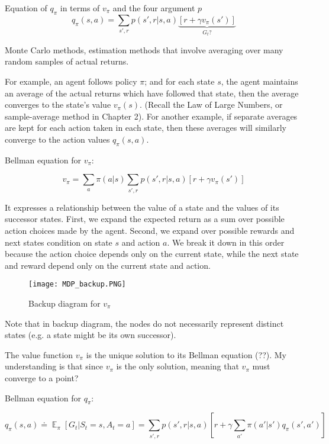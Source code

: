 \documentclass[lang=en,mode=geye,device=normal,color=blue,14pt]{elegantnote}
\DeclareMathOperator*{\E}{\mathbb{E}}
\DeclareMathOperator*{\1}{\mathbbm{1}}
\begin{document}
Equation of $q_\pi$ in terms of $v_\pi$ and the four argument $p$
$$ q_\pi(s,a) = \sum_{s', r} p(s',r|s,a) \underbrace{ [r+\gamma v_\pi(s')] }_{G_t?} $$

\begin{definition}
Monte Carlo methods, estimation methods that involve averaging over many random samples of actual returns.
\end{definition}

For example, an agent follows policy $\pi$; and for each state $s$, the agent maintains an average of the actual returns which have followed that state, then the average converges to the state's value $v_\pi(s)$. (Recall the Law of Large Numbers, or sample-average method in Chapter 2).
For another example, if separate averages are kept for each action taken in each state, then these averages will similarly converge to the action values $q_\pi(s,a)$.

\begin{definition}
Bellman equation for $v_\pi$:

$$ v_\pi = \sum_a \pi(a|s) \sum_{s',r} p(s',r|s,a) [r+ \gamma v_\pi(s')] $$
\end{definition}

It expresses a relationship between the value of a state and the values of its successor states. First, we expand the expected return as a sum over possible action choices made by the agent. Second, we expand over possible rewards and next states condition on state $s$ and action $a$. We break it down in this order because the action choice depends only on the current state, while the next state and reward depend only on the current state and action. 

\begin{figure}[!h]
  \centering
  \texttt{[image: MDP\_backup.PNG]}
  \caption{Backup diagram for $v_\pi$}
  \label{fig:MDP_backup}
\end{figure}
Note that in backup diagram, the nodes do not necessarily represent distinct states (e.g. a state might be its own successor).

The value function $v_\pi$ is the unique solution to its Bellman equation (??). My understanding is that since $v_\pi$ is the only solution, meaning that $v_\pi$ must converge to a point?

\begin{definition}
Bellman equation for $q_\pi$:

$$ q_\pi(s,a) \doteq \E_\pi [G_t | S_t = s, A_t = a] = \sum_{s',r} p(s',r|s,a)[r+\gamma \sum_{a'} \pi(a'|s')q_\pi (s',a')] $$
\end{definition}
\end{document}
